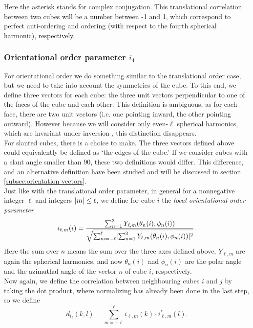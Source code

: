 \documentclass[thesis]{subfiles}
\begin{document}
Here the asterisk stands for complex conjugation. This translational correlation between two cubes will be a number between -1 and 1, which correspond to perfect anti-ordering and ordering (with respect to the fourth spherical harmonic), respectively.

\subsubsection{Orientational order parameter \texorpdfstring{$i_4$}{i4}} \label{subsubsec:orient order param}

For orientational order we do something similar to the translational order case, but we need to take into account the symmetries of the cube. To this end, we define three vectors for each cube: the three unit vectors perpendicular to one of the faces of the cube and each other. This definition is ambiguous, as for each face, there are two unit vectors (i.e. one pointing inward, the other pointing outward). However because we will consider only even-$\ell$ spherical harmonics, which are invariant under inversion \cite{steinhardt1983bond}, this distinction disappears.\\
For slanted cubes, there is a choice to make. The three vectors defined above could equivalently be defined as `the edges of the cube.' If we consider cubes with a slant angle smaller than 90\degr, these two definitions would differ. This difference, and an alternative definition have been studied and will be discussed in section \ref{subsec:orientation vectors}.
\\
Just like with the translational order parameter, in general for a nonnegative integer $\ell$ and integers $ \lvert m\rvert \leq \ell$, we define for cube $i$ the \emph{local orientational order parameter}
\begin{equation}
i_{\ell, m}(i) = \frac{\sum_{n = 1}^3 Y_{\ell, m}(\theta_n(i), \phi_n(i))}{\sqrt{\sum_{m = -\ell}^\ell \lvert\sum_{n = 1}^3 Y_{\ell, m}(\theta_n(i), \phi_n(i))\rvert^2}}.
\end{equation}
Here the sum over $n$ means the sum over the three axes defined above, $Y_{\ell, m}$ are again the spherical harmonics, and now $\theta_n(i)$ and $\phi_n(i)$ are the polar angle and the azimuthal angle of the vector $n$ of cube $i$, respectively.\\
Now again, we define the correlation between neighbouring cubes $i$ and $j$ by taking the dot product, where normalizing has already been done in the last step, so we define
\begin{equation}
d_{i_\ell}(k,l) = \sum_{m = -\ell}^\ell i_{\ell, m}(k) \cdot i^*_{\ell, m}(l).
\end{equation}
\end{document}
